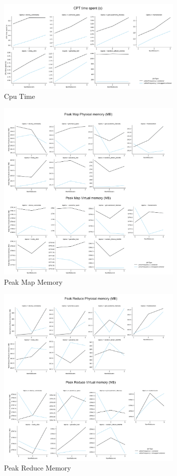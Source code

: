 \begin{figure}[H]
  \centering
  \includegraphics[width=0.8\textwidth]{media/performance/CpuTIME.png}
  \caption{Cpu Time}
  \label{fig:CpuTIME}
\end{figure}

\begin{figure}[H]
  \centering
  \includegraphics[width=0.8\textwidth]{media/performance/PeakMapMemory.png}
  \caption{Peak Map Memory}
  \label{fig:PeakMapMemory}
\end{figure}

\begin{figure}[H]
  \centering
  \includegraphics[width=0.8\textwidth]{media/performance/PeakReduceMemory.png}
  \caption{Peak Reduce Memory}
  \label{fig:PeakReduceMemory}
\end{figure}

